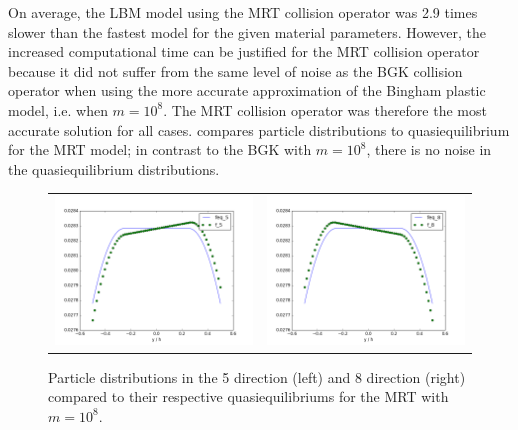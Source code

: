 \documentclass[pdftex,ms]{pittetd}
\begin{document}
On average, the LBM model using the MRT collision operator was 2.9 times slower than the fastest model for the given material parameters.
However, the increased computational time can be justified for the MRT collision operator because it did not suffer from the same level of noise as the BGK collision operator when using the more accurate approximation of the Bingham plastic model, i.e. when $m = 10^8$. 
The MRT collision operator was therefore the most accurate solution for all cases.
 compares particle distributions to quasiequilibrium for the MRT model; in contrast to the BGK with $m = 10^8$, there is no noise in the quasiequilibrium distributions.

\begin{figure}
	\centering
    \begin{tabulary}{\linewidth}{c c}
        \includegraphics[width=2.1in]{figs/poise-bingham/mrt/feq-vs-f_5.png}
        &
        \includegraphics[width=2.1in]{figs/poise-bingham/mrt/feq-vs-f_8.png}
    \end{tabulary}
    \caption{Particle distributions in the 5 direction (left) and 8 direction (right) compared to their respective quasiequilibriums for the MRT with $m = 10^8$.}
    \label{fig:feq-vs-f_mrt}
\end{figure}
\end{document}
